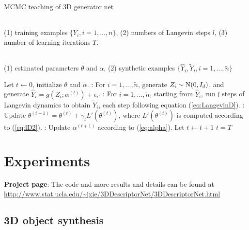\documentclass[10pt,twocolumn,letterpaper]{article}
\def\N{{\rm N}}
\def\tY{\tilde{Y}}
\def\tn{\tilde{n}}
\def\hY{\hat{Y}}
\begin{document}
\begin{algorithm}[h]
\caption{MCMC teaching of 3D generator net}
\label{code:3}
\begin{algorithmic}[1]

\REQUIRE~~\\
(1) training examples $\{Y_i, i=1,...,n\}$, (2) numbers of Langevin steps $l$, (3) number of learning iterations $T$.

\ENSURE~~\\
(1) estimated parameters $\theta$ and $\alpha$, (2) synthetic examples $\{\hY_i, \tY_i, i= 1, ..., \tilde{n}\}$ 

\item[] 
\STATE Let $t\leftarrow 0$, initialize $\theta$ and $\alpha$.
\REPEAT 
{}: For $i = 1, ..., \tn$, generate $Z_i \sim \N(0, I_d)$, and generate $\hY_i = g(Z_i; \alpha^{(t)}) + \epsilon_i$. 
: For $i = 1, ..., \tn$,  starting from $\hY_i$, run $l$ steps of Langevin  dynamics to obtain $\tY_i$,  each step 
following equation (\ref{eq:LangevinD}). 
: Update $\theta^{(t+1)} = \theta^{(t)} + \gamma_t L'(\theta^{(t)})$,  where $L'(\theta^{(t)})$ is computed according to (\ref{eq:lD2}). 
: Update $\alpha^{(t+1)}$ according to (\ref{eq:alpha}).
\STATE Let $t \leftarrow t+1$
\UNTIL $t = T$
\end{algorithmic}
\end{algorithm}

\section{Experiments}
\textbf{Project page}: The code and more results and details can be found at 
\url{http://www.stat.ucla.edu/~jxie/3DDescriptorNet/3DDescriptorNet.html}



\subsection{3D object synthesis} 
\label{Exp:objectSynthesis}
\end{document}
